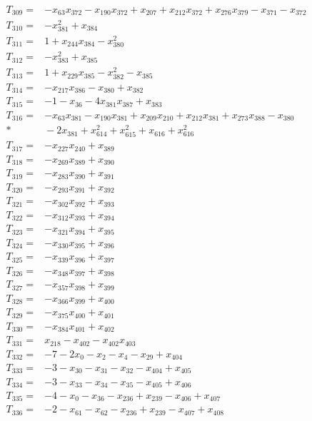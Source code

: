 \begin{align*}
T_{309}={}&-x_{63}x_{372}-x_{190}x_{372}+x_{207}+x_{212}x_{372}+x_{276}x_{379}-x_{371}-x_{372}\\[3pt]
T_{310}={}&-x_{381}^{2}+x_{384}\\[3pt]
T_{311}={}&1+x_{244}x_{384}-x_{380}^{2}\\[3pt]
T_{312}={}&-x_{383}^{2}+x_{385}\\[3pt]
T_{313}={}&1+x_{229}x_{385}-x_{382}^{2}-x_{385}\\[3pt]
T_{314}={}&-x_{217}x_{386}-x_{380}+x_{382}\\[3pt]
T_{315}={}&-1-x_{36}-4x_{381}x_{387}+x_{383}\\[3pt]
T_{316}={}&-x_{63}x_{381}-x_{190}x_{381}+x_{209}x_{210}+x_{212}x_{381}+x_{273}x_{388}-x_{380}\\*
&{}-2x_{381}+x_{614}^{2}+x_{615}^{2}+x_{616}+x_{616}^{2}\\[3pt]
T_{317}={}&-x_{227}x_{240}+x_{389}\\[3pt]
T_{318}={}&-x_{269}x_{389}+x_{390}\\[3pt]
T_{319}={}&-x_{283}x_{390}+x_{391}\\[3pt]
T_{320}={}&-x_{293}x_{391}+x_{392}\\[3pt]
T_{321}={}&-x_{302}x_{392}+x_{393}\\[3pt]
T_{322}={}&-x_{312}x_{393}+x_{394}\\[3pt]
T_{323}={}&-x_{321}x_{394}+x_{395}\\[3pt]
T_{324}={}&-x_{330}x_{395}+x_{396}\\[3pt]
T_{325}={}&-x_{339}x_{396}+x_{397}\\[3pt]
T_{326}={}&-x_{348}x_{397}+x_{398}\\[3pt]
T_{327}={}&-x_{357}x_{398}+x_{399}\\[3pt]
T_{328}={}&-x_{366}x_{399}+x_{400}\\[3pt]
T_{329}={}&-x_{375}x_{400}+x_{401}\\[3pt]
T_{330}={}&-x_{384}x_{401}+x_{402}\\[3pt]
T_{331}={}&x_{218}-x_{402}-x_{402}x_{403}\\[3pt]
T_{332}={}&-7-2x_{0}-x_{2}-x_{4}-x_{29}+x_{404}\\[3pt]
T_{333}={}&-3-x_{30}-x_{31}-x_{32}-x_{404}+x_{405}\\[3pt]
T_{334}={}&-3-x_{33}-x_{34}-x_{35}-x_{405}+x_{406}\\[3pt]
T_{335}={}&-4-x_{0}-x_{36}-x_{236}+x_{239}-x_{406}+x_{407}\\[3pt]
T_{336}={}&-2-x_{61}-x_{62}-x_{236}+x_{239}-x_{407}+x_{408}\\[3pt]

\end{align*}

